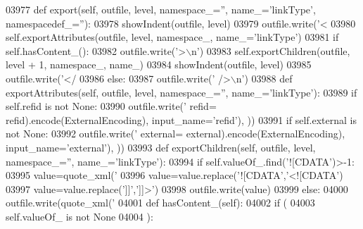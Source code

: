 \begin{DoxyCode}
{{{{{{{{{{{{{{{{{{{{{{{{{{{{{{{{{{{{{{{{{{{{{{{{{{{{{{{{{{{{{{{{{{{{{{{{{{{{{{{{{{{{{{{{{{{{{{{{{{{{{{{{{{{{{{{{{{{{{{{{{{{{{{{{{{{{{{{{{{{{{{{{{{{{{{{{{{{{{{{{{{{{{{{{{{{{{{{{{{{{{{{{{{{{{{{{{{{{{{{{{{{{{{{{{{{{{{{{{{{{{{{{{{{{{{{{{{{{{{{{{{{{{{{{{{{{{{{{03977     \textcolor{keyword}{def }export(self, outfile, level, namespace\_='', name\_='linkType', namespacedef\_=''):
03978         showIndent(outfile, level)
03979         outfile.write(\textcolor{stringliteral}{'<%
03980         self.exportAttributes(outfile, level, namespace\_, name\_=\textcolor{stringliteral}{'linkType'})
03981         \textcolor{keywordflow}{if} self.hasContent_():
03982             outfile.write(\textcolor{stringliteral}{'>\(\backslash\)n'})
03983             self.exportChildren(outfile, level + 1, namespace\_, name\_)
03984             showIndent(outfile, level)
03985             outfile.write(\textcolor{stringliteral}{'</%
03986         \textcolor{keywordflow}{else}:
03987             outfile.write(\textcolor{stringliteral}{' />\(\backslash\)n'})
03988     \textcolor{keyword}{def }exportAttributes(self, outfile, level, namespace\_='', name\_='linkType'):
03989         \textcolor{keywordflow}{if} self.refid \textcolor{keywordflow}{is} \textcolor{keywordflow}{not} \textcolor{keywordtype}{None}:
03990             outfile.write(\textcolor{stringliteral}{' refid=%
      refid).encode(ExternalEncoding), input\_name=\textcolor{stringliteral}{'refid'}), ))
03991         \textcolor{keywordflow}{if} self.external \textcolor{keywordflow}{is} \textcolor{keywordflow}{not} \textcolor{keywordtype}{None}:
03992             outfile.write(\textcolor{stringliteral}{' external=%
      external).encode(ExternalEncoding), input\_name=\textcolor{stringliteral}{'external'}), ))
03993     \textcolor{keyword}{def }exportChildren(self, outfile, level, namespace\_='', name\_='linkType'):
03994         \textcolor{keywordflow}{if} self.valueOf\_.find(\textcolor{stringliteral}{'![CDATA'})>-1:
03995             value=quote_xml(\textcolor{stringliteral}{'%
03996             value=value.replace(\textcolor{stringliteral}{'![CDATA'},\textcolor{stringliteral}{'<![CDATA'})
03997             value=value.replace(\textcolor{stringliteral}{']]'},\textcolor{stringliteral}{']]>'})
03998             outfile.write(value)
03999         \textcolor{keywordflow}{else}:
04000             outfile.write(quote_xml(\textcolor{stringliteral}{'%
04001     \textcolor{keyword}{def }hasContent_(self):
04002         \textcolor{keywordflow}{if} (
04003             self.valueOf_ \textcolor{keywordflow}{is} \textcolor{keywordflow}{not} \textcolor{keywordtype}{None}
04004             ):
}}}}}}}}}}}}}}}}}}}}}}}}}}}}}}}}}}}}}}}}}}}}}}}}}}}}}}}}}}}}}}}}}}}}}}}}}}}}}}}}}}}}}}}}}}}}}}}}}}}}}}}}}}}}}}}}}}}}}}}}}}}}}}}}}}}}}}}}}}}}}}}}}}}}}}}}}}}}}}}}}}}}}}}}}}}}}}}}}}}}}}}}}}}}}}}}}}}}}}}}}}}}}}}}}}}}}}}}}}}}}}}}}}}}}}}}}}}}}}}}}}}}}}}}}}}}}}}}}}}}}}
\end{DoxyCode}
